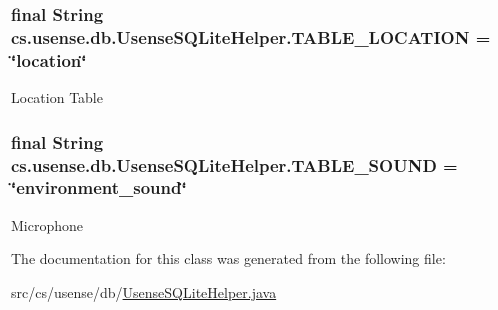 \subsubsection[{T\+A\+B\+L\+E\+\_\+\+L\+O\+C\+A\+T\+I\+O\+N}]{\setlength{\rightskip}{0pt plus 5cm}final String cs.\+usense.\+db.\+Usense\+S\+Q\+Lite\+Helper.\+T\+A\+B\+L\+E\+\_\+\+L\+O\+C\+A\+T\+I\+O\+N = \char`\"{}location\char`\"{}\hspace{0.3cm}{\ttfamily [static]}}\label{classcs_1_1usense_1_1db_1_1_usense_s_q_lite_helper_a69aa67c207caf3faf97265f325070f3f}
Location Table \hypertarget{classcs_1_1usense_1_1db_1_1_usense_s_q_lite_helper_abdc4b928a3f27481d62118b39001c7d2}{}
\subsubsection[{T\+A\+B\+L\+E\+\_\+\+S\+O\+U\+N\+D}]{\setlength{\rightskip}{0pt plus 5cm}final String cs.\+usense.\+db.\+Usense\+S\+Q\+Lite\+Helper.\+T\+A\+B\+L\+E\+\_\+\+S\+O\+U\+N\+D = \char`\"{}environment\+\_\+sound\char`\"{}\hspace{0.3cm}{\ttfamily [static]}}\label{classcs_1_1usense_1_1db_1_1_usense_s_q_lite_helper_abdc4b928a3f27481d62118b39001c7d2}
Microphone 

The documentation for this class was generated from the following file\+:\begin{DoxyCompactItemize}
\item 
src/cs/usense/db/\hyperlink{_usense_s_q_lite_helper_8java}{Usense\+S\+Q\+Lite\+Helper.\+java}\end{DoxyCompactItemize}
